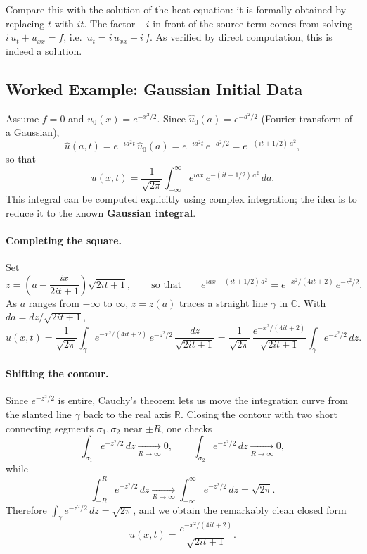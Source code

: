 \begin{remark}
Compare this with the solution of the heat equation: it is formally obtained by replacing $t$ with $it$. The factor $-i$ in front of the source term comes from solving $i\,u_t + u_{xx} = f$, i.e.\ $u_t = i\,u_{xx} - i\,f$. As verified by direct computation, this is indeed a solution.
\end{remark}

\subsection{Worked Example: Gaussian Initial Data}

\begin{example}
Assume $f = 0$ and $u_0(x) = e^{-x^2/2}$. Since $\hat{u}_0(a) = e^{-a^2/2}$ (Fourier transform of a Gaussian),
\[
\hat{u}(a, t) = e^{-i a^2 t}\,\hat{u}_0(a) = e^{-i a^2 t}\,e^{-a^2/2} = e^{-(it + 1/2)\,a^2},
\]
so that
\[
u(x, t) = \frac{1}{\sqrt{2\pi}}\int_{-\infty}^{\infty} e^{iax}\,e^{-(it + 1/2)\,a^2}\,da.
\]
This integral can be computed explicitly using complex integration; the idea is to reduce it to the known \textbf{Gaussian integral}.

\paragraph{Completing the square.}
Set
\[
z = \left(a - \frac{ix}{2it + 1}\right)\sqrt{2it + 1},
\qquad\text{so that}\qquad
e^{iax - (it + 1/2)\,a^2} = e^{-x^2/(4it + 2)}\,e^{-z^2/2}.
\]
As $a$ ranges from $-\infty$ to $\infty$, $z = z(a)$ traces a straight line $\gamma$ in $\mathbb{C}$. With $da = dz/\sqrt{2it + 1}$,
\[
u(x, t)
= \frac{1}{\sqrt{2\pi}}\int_\gamma e^{-x^2/(4it + 2)}\,e^{-z^2/2}\,\frac{dz}{\sqrt{2it + 1}}
= \frac{1}{\sqrt{2\pi}}\,\frac{e^{-x^2/(4it + 2)}}{\sqrt{2it + 1}}\int_\gamma e^{-z^2/2}\,dz.
\]

\paragraph{Shifting the contour.}
Since $e^{-z^2/2}$ is entire, Cauchy's theorem lets us move the integration curve from the slanted line $\gamma$ back to the real axis $\mathbb{R}$. Closing the contour with two short connecting segments $\sigma_1, \sigma_2$ near $\pm R$, one checks
\[
\int_{\sigma_1} e^{-z^2/2}\,dz \xrightarrow[R \to \infty]{} 0, \qquad
\int_{\sigma_2} e^{-z^2/2}\,dz \xrightarrow[R \to \infty]{} 0,
\]
while
\[
\int_{-R}^{R} e^{-z^2/2}\,dz \xrightarrow[R \to \infty]{} \int_{-\infty}^{\infty} e^{-z^2/2}\,dz = \sqrt{2\pi}.
\]
Therefore $\int_\gamma e^{-z^2/2}\,dz = \sqrt{2\pi}$, and we obtain the remarkably clean closed form
\[
\boxed{u(x, t) = \frac{e^{-x^2/(4it + 2)}}{\sqrt{2it + 1}}.}
\]
\end{example}
